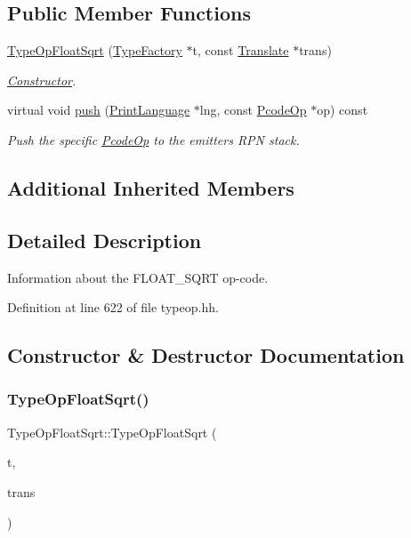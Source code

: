 \subsection*{Public Member Functions}
\begin{DoxyCompactItemize}
\item 
\mbox{\hyperlink{class_type_op_float_sqrt_a31bb4171851d420d90b58edef8515642}{Type\+Op\+Float\+Sqrt}} (\mbox{\hyperlink{class_type_factory}{Type\+Factory}} $\ast$t, const \mbox{\hyperlink{class_translate}{Translate}} $\ast$trans)
\begin{DoxyCompactList}\small\item\em \mbox{\hyperlink{class_constructor}{Constructor}}. \end{DoxyCompactList}\item 
virtual void \mbox{\hyperlink{class_type_op_float_sqrt_a18e76ebe588fb1b41b0917f52451e258}{push}} (\mbox{\hyperlink{class_print_language}{Print\+Language}} $\ast$lng, const \mbox{\hyperlink{class_pcode_op}{Pcode\+Op}} $\ast$op) const
\begin{DoxyCompactList}\small\item\em Push the specific \mbox{\hyperlink{class_pcode_op}{Pcode\+Op}} to the emitter\textquotesingle{}s R\+PN stack. \end{DoxyCompactList}\end{DoxyCompactItemize}
\subsection*{Additional Inherited Members}


\subsection{Detailed Description}
Information about the F\+L\+O\+A\+T\+\_\+\+S\+Q\+RT op-\/code. 

Definition at line 622 of file typeop.\+hh.



\subsection{Constructor \& Destructor Documentation}
\mbox{\label{class_type_op_float_sqrt_a31bb4171851d420d90b58edef8515642}} 
\subsubsection{\texorpdfstring{TypeOpFloatSqrt()}{TypeOpFloatSqrt()}}
{\footnotesize\ttfamily Type\+Op\+Float\+Sqrt\+::\+Type\+Op\+Float\+Sqrt (\begin{DoxyParamCaption}\item[{\mbox{\hyperlink{class_type_factory}{Type\+Factory}} $\ast$}]{t,  }\item[{const \mbox{\hyperlink{class_translate}{Translate}} $\ast$}]{trans }\end{DoxyParamCaption})}



